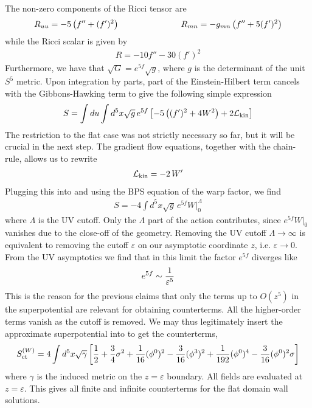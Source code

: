 \documentclass[12pt]{article}
\begin{document}
The non-zero components of the Ricci tensor are
\begin{eqnarray}
R_{uu} = - 5 \left(f'' + (f')^2 \right) \hspace{1 in} R_{mn} =  -g_{mn} \left(f'' + 5(f')^2 \right)
\end{eqnarray}
while the Ricci scalar is given by
\begin{eqnarray}
R = - 10 f'' - 30(f')^2 
\end{eqnarray}
Furthermore, we have that $\sqrt{G} = e^{5f} \sqrt{g}$, where $g$ is the determinant of the unit $S^5$ metric. Upon integration by parts, part of the Einstein-Hilbert term cancels with the Gibbons-Hawking term to give the following simple expression
\begin{eqnarray}
S = \int du \int d^5 x \sqrt{g}\, e^{5f}\left[-5 \left((f')^2 +4 W^2 \right)+2 {\cal L}_{\mathrm{kin}}\right]
\end{eqnarray}
The restriction to the flat case was not strictly necessary so far, but it will be crucial in the next step.
The gradient flow equations, together with the chain-rule, allows us to rewrite
\begin{eqnarray}
{\cal L}_{\mathrm{kin}} =-2\,  W'
\end{eqnarray}
Plugging this into and using the BPS equation of the warp factor, we find
\begin{eqnarray}
S = -4  \int d^5 x \sqrt{g}\,e^{5f} W \Big|_0^\Lambda
\end{eqnarray}
where $\Lambda$ is the UV cutoff. Only the $\Lambda$ part of the action contributes, since $e^{5f} W|_0$ vanishes due to the close-off of the geometry. 
Removing the UV cutoff $\Lambda\rightarrow \infty$ is equivalent to removing the cutoff $\varepsilon$ on our asymptotic coordinate $z$, i.e. $\varepsilon\rightarrow 0$. From the UV asymptotics we find that in this limit the factor $e^{5f}$ diverges like 
\begin{eqnarray}
e^{5f} \sim {1 \over \varepsilon^5}
\end{eqnarray}
This is the reason for the previous claims that only the terms up to $O(z^5)$ in the superpotential are relevant for obtaining counterterms. All the higher-order terms vanish as the cutoff is removed. 
We may thus legitimately insert the approximate superpotential into to get the counterterms, 
\begin{eqnarray}
S^{(W)}_{\mathrm{ct}} = 4 \int d^5x \sqrt{\gamma} \left[  {1\over 2} + {3 \over 4} \sigma^2 + {1 \over 16} (\phi^0)^2 -{3 \over 16} (\phi^3)^2 + {1 \over 192} (\phi^0)^4 -{3 \over 16} (\phi^0)^2 \sigma \right]
\end{eqnarray}
where $\gamma$ is the induced metric on the $z = \varepsilon$ boundary. All fields are evaluated at $z = \varepsilon$. This gives all finite and infinite counterterms for the flat domain wall solutions.
\end{document}

